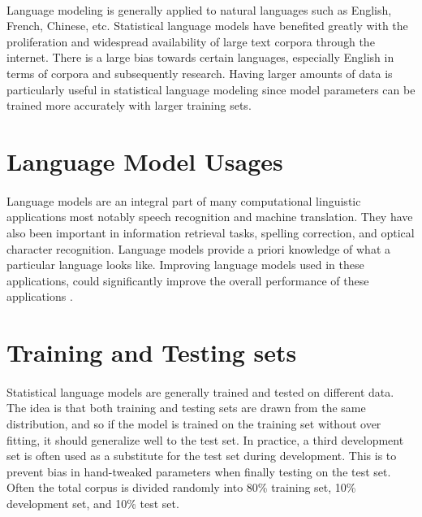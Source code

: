 \documentclass[12pt]{ociamthesis}
\begin{document}
\paragraph{}
Language modeling is generally applied to natural languages such as English, French, Chinese, etc. Statistical language models have benefited greatly with the proliferation and widespread availability of large text corpora through the internet. There is a large bias towards certain languages, especially English in terms of corpora and subsequently research. Having larger amounts of data is particularly useful in statistical language modeling since model parameters can be trained more accurately with larger training sets. 

\section{Language Model Usages}
\paragraph{}
Language models are an integral part of many computational linguistic applications most notably speech recognition and machine translation. They have also been important in information retrieval tasks, spelling correction, and optical character recognition. Language models provide a priori knowledge of what a particular language looks like. Improving language models used in these applications, could significantly improve the overall performance of these applications \cite{Jurafsky2009}. 

\section{Training and Testing sets}
\paragraph{}
Statistical language models are generally trained and tested on different data. The idea is that both training and testing sets are drawn from the same distribution, and so if the model is trained on the training set without over fitting, it should generalize well to the test set. In practice, a third development set is often used as a substitute for the test set during development. This is to prevent bias in hand-tweaked parameters when finally testing on the test set. Often the total corpus is divided randomly into 80\% training set, 10\% development set, and 10\% test set.
\end{document}
